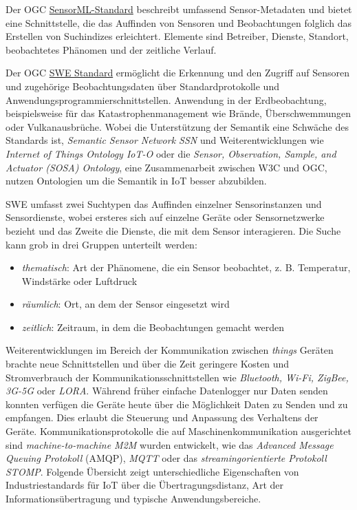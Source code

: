 \documentclass[
  11pt,
  a4paperpaper,
  oneside, openany  ,captions=tableheading
]{scrbook}
\providecommand{\tightlist}{%
  \setlength{\itemsep}{0pt}\setlength{\parskip}{0pt}}
\theoremstyle{definition}
\theoremstyle{remark}
\begin{document}
\begin{description}
\tightlist
\item[Sensor Model Language SensorML-Standard\index{SensorML-Standard}]
Der OGC \href{https://www.ogc.org/standard/sensorml}{SensorML-Standard}
beschreibt umfassend Sensor-Metadaten und bietet eine Schnittstelle, die
das Auffinden von Sensoren und Beobachtungen folglich das Erstellen von
Suchindizes erleichtert. Elemente sind Betreiber, Dienste, Standort,
beobachtetes Phänomen und der zeitliche Verlauf.
\item[Sensor Web Enablement SWE standards
suite\index{Sensor Web Enablement SWE standards}]
Der OGC \href{https://www.ogc.org/standard/swes}{SWE Standard}
ermöglicht die Erkennung und den Zugriff auf Sensoren und zugehörige
Beobachtungsdaten über Standardprotokolle und
Anwendungsprogrammierschnittstellen. Anwendung in der Erdbeobachtung,
beispielsweise für das Katastrophenmanagement wie Brände,
Überschwemmungen oder Vulkanausbrüche. Wobei die Unterstützung der
Semantik eine Schwäche des Standards ist, \emph{Semantic Sensor Network
SSN} und Weiterentwicklungen wie \emph{Internet of Things Ontology
IoT-O} oder die \emph{Sensor, Observation, Sample, and Actuator (SOSA)
Ontology}, eine Zusammenarbeit zwischen W3C und OGC, nutzen Ontologien
um die Semantik in IoT besser abzubilden.
\end{description}

SWE umfasst zwei Suchtypen das Auffinden einzelner Sensorinstanzen und
Sensordienste, wobei ersteres sich auf einzelne Geräte oder
Sensornetzwerke bezieht und das Zweite die Dienste, die mit dem Sensor
interagieren. Die Suche kann grob in drei Gruppen unterteilt werden:

\begin{itemize}
\tightlist
\item
  \emph{thematisch}: Art der Phänomene, die ein Sensor beobachtet, z. B.
  Temperatur, Windstärke oder Luftdruck
\item
  \emph{räumlich}: Ort, an dem der Sensor eingesetzt wird
\item
  \emph{zeitlich}: Zeitraum, in dem die Beobachtungen gemacht werden
\end{itemize}

Weiterentwicklungen im Bereich der Kommunikation zwischen \emph{things}
Geräten brachte neue Schnittstellen und über die Zeit geringere Kosten
und Stromverbrauch der Kommunikationsschnittstellen wie \emph{Bluetooth,
Wi-Fi, ZigBee, 3G-5G} oder \emph{LORA}. Während früher einfache
Datenlogger nur Daten senden konnten verfügen die Geräte heute über die
Möglichkeit Daten zu Senden und zu empfangen. Dies erlaubt die Steuerung
und Anpassung des Verhaltens der Geräte. Kommunikationsprotokolle die
auf Maschinenkommunikation ausgerichtet sind \emph{machine-to-machine
M2M} wurden entwickelt, wie das \emph{Advanced Message Queuing
Protokoll} (AMQP), \emph{MQTT} oder das \emph{streamingorientierte
Protokoll STOMP}. Folgende Übersicht zeigt unterschiedliche
Eigenschaften von Industriestandards für IoT über die
Übertragungsdistanz, Art der Informationsübertragung und typische
Anwendungsbereiche.
\end{document}
